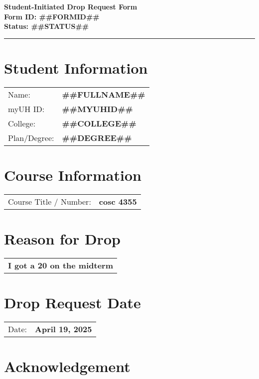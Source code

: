 \documentclass[12pt]{article}
\begin{document}
\begin{center}
  \textbf{\Large Student-Initiated Drop Request Form}\\[0.2cm]
  \textbf{Form ID: ##FORMID##}\\[0.2cm]
  \textbf{Status: ##STATUS##}
\end{center}

\hrule
\vspace{0.5cm}

\section*{Student Information}
\begin{tabular}{ll}
Name: & \textbf{##FULLNAME##} \\
myUH ID: & \textbf{##MYUHID##} \\
College: & \textbf{##COLLEGE##} \\
Plan/Degree: & \textbf{##DEGREE##} \\
\end{tabular}

\vspace{0.5cm}

\section*{Course Information}
\begin{tabular}{ll}
Course Title / Number: & \textbf{cosc 4355} \\
\end{tabular}

\section*{Reason for Drop}
\begin{tabular}{p{12cm}}
\textbf{I got a 20 on the midterm}
\end{tabular}

\section*{Drop Request Date}
\begin{tabular}{ll}
Date: & \textbf{April 19, 2025} \\
\end{tabular}

\section*{Acknowledgement}
\noindent{}
\end{document}
